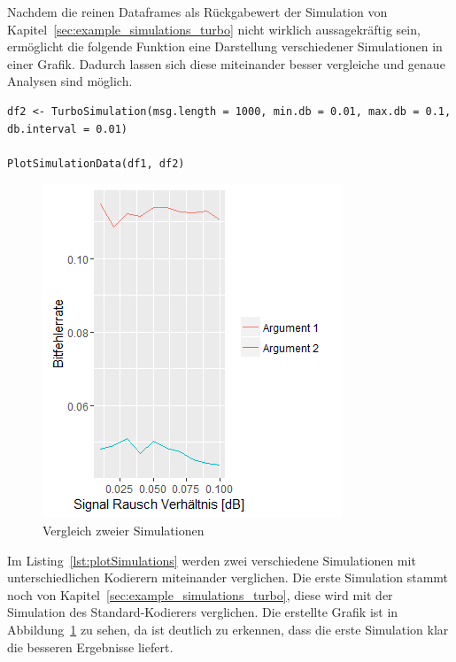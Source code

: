 Nachdem die reinen Dataframes als Rückgabewert der Simulation von Kapitel~\ref{sec:example_simulations_turbo} nicht wirklich aussagekräftig sein, ermöglicht die folgende Funktion eine Darstellung verschiedener Simulationen in einer Grafik. Dadurch lassen sich diese miteinander besser vergleiche und genaue Analysen sind möglich.

\begin{lstlisting}[caption=Vergleich mehrerer Simulationen, label={lst:plotSimulations}, float=!th]
df2 <- TurboSimulation(msg.length = 1000, min.db = 0.01, max.db = 0.1, db.interval = 0.01)

PlotSimulationData(df1, df2)
\end{lstlisting}

\begin{figure}[ht]
\centering
\includegraphics[width=\ScaleIfNeeded]{pictures/PlotSimulations}
\caption{Vergleich zweier Simulationen}
\label{pic:plotSimulations}
\end{figure}

Im Listing~\ref{lst:plotSimulations} werden zwei verschiedene Simulationen mit unterschiedlichen Kodierern miteinander verglichen. Die erste Simulation stammt noch von Kapitel~\ref{sec:example_simulations_turbo}, diese wird mit der Simulation des Standard-Kodierers verglichen. Die erstellte Grafik ist in Abbildung~\ref{pic:plotSimulations} zu sehen, da ist deutlich zu erkennen, dass die erste Simulation klar die besseren Ergebnisse liefert.

\FloatBarrier